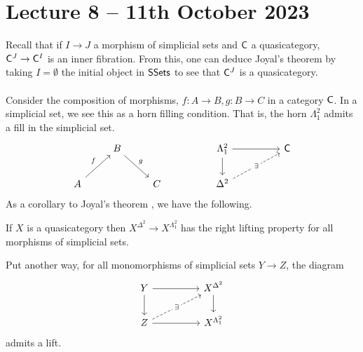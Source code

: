 \section{Lecture 8 -- 11th October 2023}
Recall that if $I\to J$ a morphism of simplicial sets and $\mathsf{C}$ a quasicategory, $\mathsf{C}^{J}\to\mathsf{C}^{I}$ is an inner fibration. From this, one can deduce Joyal's theorem by taking $I=\emptyset$ the initial object in $\mathsf{SSets}$ to see that $\mathsf{C}^{J}$ is a quasicategory. 
\\\\
Consider the composition of morphisms, $f:A\to B, g:B\to C$ in a category $\mathsf{C}$. In a simplicial set, we see this as a horn filling condition. That is, the horn $\Lambda^{2}_{1}$ admits a fill in the simplicial set. 
$$%
\begin{tikzcd}
	& B &&& {\Lambda^{2}_{1}} && \Csf \\
	A && C && {\Delta^{2}}
	\arrow["f", from=2-1, to=1-2]
	\arrow["g", from=1-2, to=2-3]
	\arrow[from=1-5, to=1-7]
	\arrow[from=1-5, to=2-5]
	\arrow["\exists"{description}, dashed, from=2-5, to=1-7]
\end{tikzcd}$$
As a corollary to Joyal's theorem , we have the following. 
\begin{corollary}
  If $X$ is a quasicategory then $X^{\Delta^{2}}\to X^{\Lambda^{2}_{1}}$ has the right lifting property for all morphisms of simplicial sets. 
\end{corollary}
Put another way, for all monomorphisms of simplicial sets $Y\to Z$, the diagram 
$$%
\begin{tikzcd}
	Y && {X^{\Delta^{2}}} \\
	Z && {X^{\Lambda^{2}_{1}}}
	\arrow[from=1-1, to=2-1]
	\arrow[from=1-3, to=2-3]
	\arrow[from=1-1, to=1-3]
	\arrow[from=2-1, to=2-3]
	\arrow["\exists"{description}, dashed, from=2-1, to=1-3]
\end{tikzcd}$$
admits a lift. 
